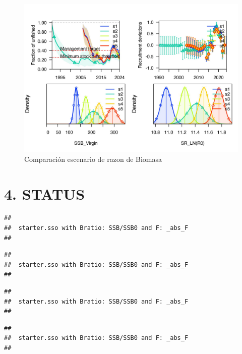\documentclass[
]{article}
\begin{document}
\begin{figure}[H]

{\centering \includegraphics{Dtrunculus_SS3_2024_files/figure-latex/devrec-1} 

}

\caption{\label{fig:devrec}Comparación escenario de razon de Biomasa}\label{fig:devrec}
\end{figure}

\hypertarget{status}{%
\section{4. STATUS}\label{status}}

\begin{verbatim}
## 
##  starter.sso with Bratio: SSB/SSB0 and F: _abs_F 
## 
\end{verbatim}

\begin{verbatim}
## 
##  starter.sso with Bratio: SSB/SSB0 and F: _abs_F 
## 
\end{verbatim}

\begin{verbatim}
## 
##  starter.sso with Bratio: SSB/SSB0 and F: _abs_F 
## 
\end{verbatim}

\begin{verbatim}
## 
##  starter.sso with Bratio: SSB/SSB0 and F: _abs_F 
## 
\end{verbatim}
\end{document}

